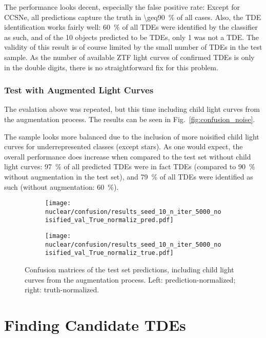 The performance looks decent, especially the false positive rate: Except for CCSNe, all predictions capture the truth in \SI{\geq90}{\percent} of all cases. Also, the TDE identification works fairly well: \SI{60}{\percent} of all TDEs were identified by the classifier as such, and of the 10 objects predicted to be TDEs, only 1 was not a TDE. The validity of this result is of course limited by the small number of TDEs in the test sample. As the number of available ZTF light curves of confirmed TDEs is only in the double digits, there is no straightforward fix for this problem.

\subsubsection{Test with Augmented Light Curves}
The evalation above was repeated, but this time including child light curves from the augmentation process. The results can be seen in Fig.~\ref{fig:confusion_noise}.

The sample looks more balanced due to the inclusion of more noisified child light curves for underrepresented classes (except stars). As one would expect, the overall performance does increase when compared to the test set without child light curves: \SI{97}{\percent} of all predicted TDEs were in fact TDEs (compared to \SI{90}{\percent} without augmentation in the test set), and \SI{79}{\percent} of all TDEs were identified as such (without augmentation: \SI{60}{\percent}).

\begin{figure}[htb]
  \centering
  \begin{subfigure}[b]{0.49\textwidth}
    \centering
    \texttt{[image: nuclear/confusion/results\_seed\_10\_n\_iter\_5000\_noisified\_val\_True\_normaliz\_pred.pdf]}
  \end{subfigure}
  \begin{subfigure}[b]{0.49\textwidth}
    \centering
    \texttt{[image: nuclear/confusion/results\_seed\_10\_n\_iter\_5000\_noisified\_val\_True\_normaliz\_true.pdf]}
  \end{subfigure}
  \caption[Confusion matrices with augmentation]{Confusion matrices of the test set predictions, including child light curves from the augmentation process. Left: prediction-normalized; right: truth-normalized.}
\end{figure}


\section{Finding Candidate TDEs}\label{visual_cuts}

